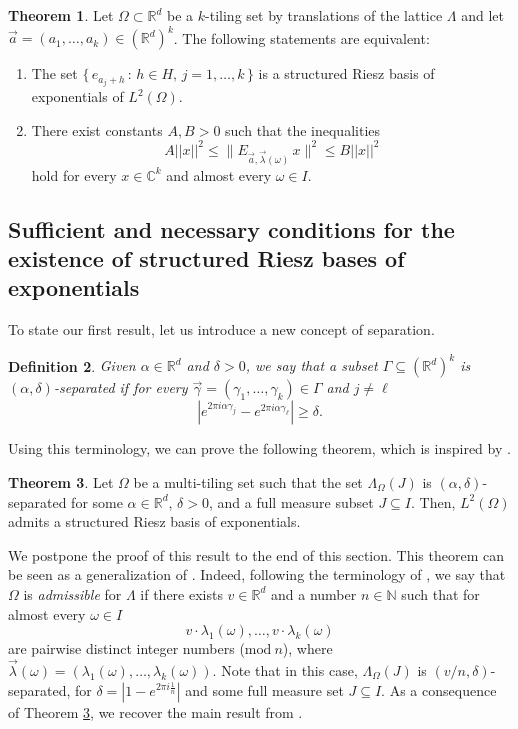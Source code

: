 \documentclass[a4paper,11pt]{amsart}
\newtheorem{fed}{Definition}[section]
\theoremstyle{definition}
\newtheorem{teo}[fed]{Theorem}
\theoremstyle{definition}
\def\la{\lambda}
\def\La{\Lambda}
\def\w{\omega}
\def\W{\Omega}
\def\N{\mathbb{N}}
\def\R{\mathbb{R}}
\def\C{\mathbb{C}}
\begin{document}
\begin{teo}\label{caracterizacion1}
	Let $\W\subset\R^d$ be a $k$-tiling set by translations of the lattice $\La$ and let $\vec{a} = (a_1,\dots,a_k)\in(\R^d)^k$. The following statements are equivalent: 
	\begin{enumerate}
		\item[i)] The set $\{\,e_{a_j + h}\,:\, h\in H,\, j=1,\dots, k\,\}$ is a structured Riesz basis of exponentials of $L^2(\W)$.
		\item[ii)] There exist constants $A,B>0$ such that the inequalities 
		\begin{equation}\label{equiv-inequ}
			A||x||^2 \leq \|E_{\vec{a},\vec{\la}(\w)} \,x\|^2\leq B||x||^2
		\end{equation}
		hold for every $x\in\C^k$ and almost every $\w\in I$.
	\end{enumerate}
\end{teo}	


\subsection{Sufficient and necessary conditions for the existence of structured Riesz bases of exponentials}

To state our first result, let us introduce a new concept of separation.

\begin{fed}\label{def:sep}
	Given $\alpha \in\R^d$ and $\delta>0$, we say that a subset $\Gamma\subseteq (\R^d)^k$ is $(\alpha,\delta)$-separated if for every $\vec{\gamma}=(\gamma_1,\ldots,\gamma_k)\in\Gamma$ and $j\neq \ell$
	$$
	|e^{2\pi i  \alpha \gamma_{j}}-e^{2\pi i  \alpha \gamma_{\ell} }|\geq \delta.
	$$
\end{fed}

Using this terminology, we can prove the following theorem, which is inspired by \cite[Corollary 4.2]{CUC}.

\begin{teo}\label{separados}
	Let $\W$ be a multi-tiling set such that  the set $\La_\W(J)$ is $( \alpha,\delta)$-separated for some $ \alpha \in\R^d$, $\delta>0$, and a full measure subset $J\subseteq I$. Then, $L^2(\W)$ admits a structured Riesz basis of exponentials.
\end{teo}

We postpone the proof of this result to the end of this section. This theorem can be seen as a generalization of \cite[Theorem 1.1]{CC}. Indeed, following the terminology of \cite{CC},  we say that $\W$ is  \textit{admissible} for $\La$ if there exists $v\in \R^d$ and a number $n\in\N$ such that for almost every $\w\in I$ 
\begin{equation}\label{admissible}
	v\cdot \la_1(\w),\ldots,v\cdot \la_k(\w)
\end{equation}
are pairwise distinct integer numbers ($\mbox{mod}\ n$), where $\vec{\la}(\w) = (\la_1(\w),\dots,\la_k(\w))$. Note that in this case, $\La_\W(J)$ is $(v/n,\delta)$-separated, for $\delta=|1-e^{2\pi i \frac1n}|$ and some full measure set $J\subseteq I$. As a consequence of Theorem \ref{separados}, we recover the main result from \cite{CC}.
\end{document}
